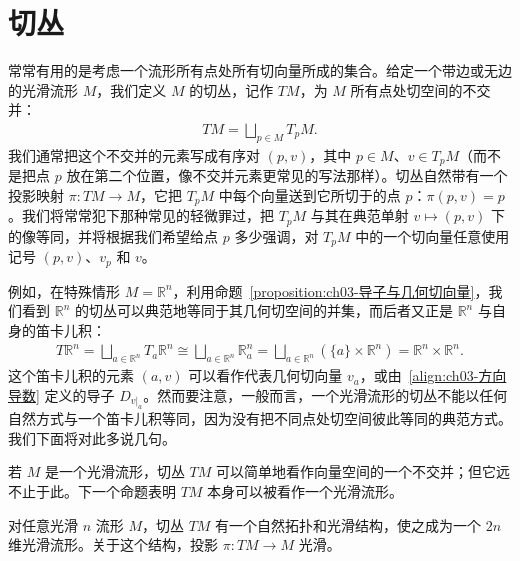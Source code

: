 \documentclass[../../main.tex]{subfiles}
\begin{document}
\section{切丛}\label{section:ch03-切丛}

常常有用的是考虑一个流形所有点处所有切向量所成的集合。给定一个带边或无边的光滑流形 $M$，我们定义 $M$ 的切丛，记作 $TM$，为 $M$ 所有点处切空间的不交并：
\begin{align*}
TM=\bigsqcup_{p\in M}T_{p}M.
\end{align*}
我们通常把这个不交并的元素写成有序对 $(p,v)$，其中 $p\in M$、$v\in T_{p}M$（而不是把点 $p$ 放在第二个位置，像不交并元素更常见的写法那样）。切丛自然带有一个投影映射 $\pi:TM\to M$，它把 $T_{p}M$ 中每个向量送到它所切于的点 $p$：$\pi(p,v)=p$。我们将常常犯下那种常见的轻微罪过，把 $T_{p}M$ 与其在典范单射 $v\mapsto(p,v)$ 下的像等同，并将根据我们希望给点 $p$ 多少强调，对 $T_{p}M$ 中的一个切向量任意使用记号 $(p,v)$、$v_{p}$ 和 $v$。

例如，在特殊情形 $M=\mathbb{R}^{n}$，利用命题~\cref{proposition:ch03-导子与几何切向量}，我们看到 $\mathbb{R}^{n}$ 的切丛可以典范地等同于其几何切空间的并集，而后者又正是 $\mathbb{R}^{n}$ 与自身的笛卡儿积：
\begin{align*}
T\mathbb{R}^{n}=\bigsqcup_{a\in\mathbb{R}^{n}}T_{a}\mathbb{R}^{n}\cong\bigsqcup_{a\in\mathbb{R}^{n}}\mathbb{R}^{n}_{a}=\bigsqcup_{a\in\mathbb{R}^{n}}(\{a\}\times\mathbb{R}^{n})=\mathbb{R}^{n}\times\mathbb{R}^{n}.
\end{align*}
这个笛卡儿积的元素 $(a,v)$ 可以看作代表几何切向量 $v_{a}$，或由~\eqref{align:ch03-方向导数} 定义的导子 $D_{v|_{a}}$。然而要注意，一般而言，一个光滑流形的切丛不能以任何自然方式与一个笛卡儿积等同，因为没有把不同点处切空间彼此等同的典范方式。我们下面将对此多说几句。

若 $M$ 是一个光滑流形，切丛 $TM$ 可以简单地看作向量空间的一个不交并；但它远不止于此。下一个命题表明 $TM$ 本身可以被看作一个光滑流形。

\begin{proposition}\label{proposition:ch03-切丛流形}
对任意光滑 $n$ 流形 $M$，切丛 $TM$ 有一个自然拓扑和光滑结构，使之成为一个 $2n$ 维光滑流形。关于这个结构，投影 $\pi:TM\to M$ 光滑。
\end{proposition}
\end{document}
